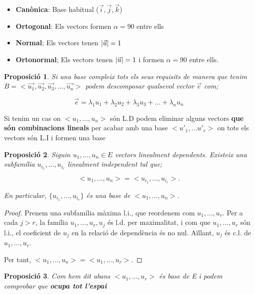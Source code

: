 \documentclass[12pt]{article}
\newtheorem{proposicio}{Proposició}[section]
\begin{document}
\begin{itemize}
    \item \textbf{Canònica}: Base habitual ($\vec{i}, \vec{j},\vec{k}$)
    \item \textbf{Ortogonal}: Els vectors formen $\alpha = 90$ entre ells
    \item \textbf{Normal}; Els vectors tenen $\abs{\vec{u}} = 1$
    \item \textbf{Ortonormal}; Els vectors tenen $\abs{\vec{u}} = 1$ i formen $\alpha = 90$ entre ells.
\end{itemize}

\begin{proposicio}
    Si una base compleix tots els seus requisits de manera que tenim $B = <\vec{u_1}, \vec{u_2}, \vec{u_3}, \dots, \vec{u_n}>$ podem descomposar qualsevol vector $\vec{e}$ com;
\end{proposicio}

\[\vec{e} = \lambda_1 u_1 + \lambda_2 u_2 + \lambda_3 u_3 + \dots + \lambda_n u_n\]

Si tenim un cas on $<u_1,\dots, u_n>$ són L.D podem eliminar alguns vectors \textbf{que són combinacions lineals} per acabar amb una base $<u'_1, \dots u'_r>$ on tots els vectors són L.I i formen una base

\begin{proposicio}
Siguin $u_1,\dots,u_n \in E$ vectors linealment dependents. Existeix una subfamília $u_{i_1},\dots,u_{i_r}$ linealment independent tal que;

\[<u_1,\dots,u_n> = <u_{i_1},\dots,u_{i_r}> .\]

En particular, $\{u_{i_1},\dots,u_{i_r}\}$ és una base de $<u_1,\dots,u_n>$.
\end{proposicio}

\begin{proof}
Prenem una subfamília màxima l.i., que reordenem com $u_1,\dots,u_r$. Per a cada $j>r$, la família $u_1,\dots,u_r,u_j$ és l.d. per maximalitat, i com que $u_1,\dots,u_r$ són l.i., el coeficient de $u_j$ en la relació de dependència és no nul. Aïllant, $u_j$ és c.l. de $u_1,\dots,u_r$.

Per tant, $<u_1,\dots,u_n> = <u_1,\dots,u_r>$.
\end{proof}

\begin{proposicio}
    Com hem dit abans $<u_1, \dots, u_r>$ és base de E i podem comprobar que \textbf{ocupa tot l'espai}
\end{proposicio}
\end{document}
